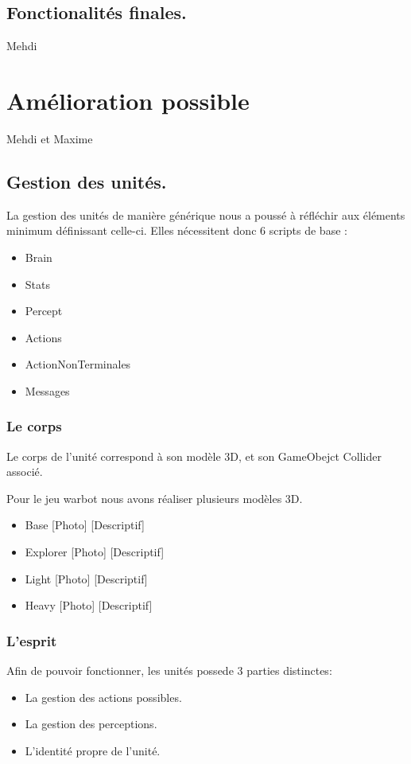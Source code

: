 \documentclass{report}
\begin{document}
\subsection{Fonctionalités finales.}
Mehdi
\section{Amélioration possible}
Mehdi et Maxime
\subsection{Gestion des unités.}

La gestion des unités de manière générique nous a poussé à réfléchir aux éléments minimum définissant celle-ci.
Elles nécessitent donc 6 scripts de base : 
\begin{itemize}
\item Brain
\item Stats
\item Percept
\item Actions
\item ActionNonTerminales
\item Messages
\end{itemize}

\subsubsection{Le corps}

Le corps de l'unité correspond à son modèle 3D, et son GameObejct Collider associé.

Pour le jeu warbot nous avons réaliser plusieurs modèles 3D.
\begin{itemize}
\item Base
[Photo]
[Descriptif]
\item Explorer
[Photo]
[Descriptif]
\item Light
[Photo]
[Descriptif]
\item Heavy
[Photo]
[Descriptif]
\end{itemize}

\subsubsection{L'esprit}
Afin de pouvoir fonctionner, les unités possede 3 parties distinctes: 
\begin{itemize}
\item La gestion des actions possibles.
\item La gestion des perceptions.
\item L'identité propre de l'unité.
\end{itemize}
\end{document}
